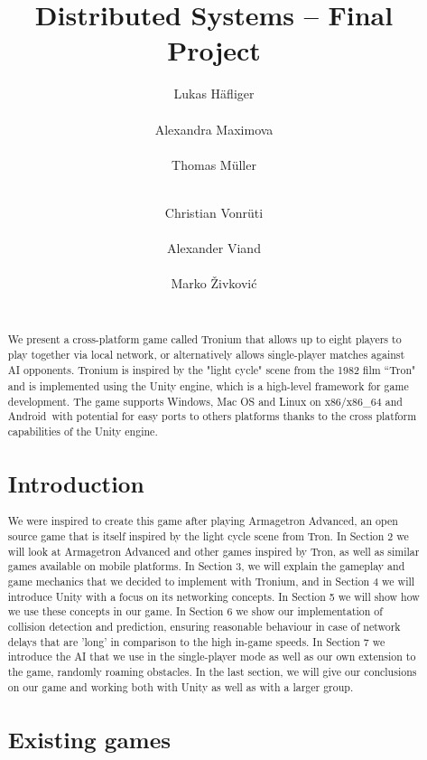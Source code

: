 \documentclass{report}
\title{Distributed Systems -- Final Project}
\author{
%
%
\alignauthor Lukas Häfliger\\
	\affaddr{ETH ID 11-916-376}\\
	\email{haelukas@student.ethz.ch}
\alignauthor Alexandra Maximova\\
 	\affaddr{ETH ID 09-913-534}\\
 	\email{amaximov@student.ethz.ch}
 	\alignauthor Thomas Müller\\
 	\affaddr{ETH ID 11-946-936}\\
 	\email{muelltho@student.ethz.ch} 
\and  %
\alignauthor Christian Vonrüti\\
 	\affaddr{ETH ID 11-930-914}\\
 	\email{cvonruet@student.ethz.ch} 
\alignauthor Alexander Viand\\
	\affaddr{ETH ID 09-940-131}\\
	\email{vianda@student.ethz.ch}
\alignauthor Marko Živković\\
	\affaddr{ETH ID 10-921-211}\\
	\email{markoz@student.ethz.ch}
}
\begin{document}
\maketitle

\begin{abstract}
We present a cross-platform game called Tronium that allows up to eight players to play together via local network, 
or alternatively allows single-player matches against AI opponents. 
Tronium is inspired by the "light cycle" scene from the 1982 film ``Tron" and is implemented using the  Unity\textsuperscript{\textregistered} 
engine, which is a high-level framework for game development.
The game supports Windows, Mac OS and Linux on x86/x86\_64 and Android\texttrademark \ 
with potential for easy ports to others platforms thanks to the cross platform capabilities of the Unity  engine.


 
\section{Introduction}

We were inspired to create this game after playing Armagetron Advanced\cite{AA}, an open source game that is itself inspired by the light cycle scene from Tron. 
In Section 2 we will look at Armagetron Advanced and other games inspired by Tron, as well as similar games available on mobile platforms.
In Section 3, we will explain the gameplay and game mechanics that we decided to implement with Tronium, and in  Section 4 we will introduce Unity with a focus on its networking concepts. In Section 5 we will show how we use these concepts in our game. 
In Section 6 we show our implementation of collision detection and prediction, ensuring reasonable behaviour in case of network delays that are 'long' in comparison to the high in-game speeds.
In Section 7 we introduce the AI that we use in the single-player mode as well as our own extension to the game,  randomly roaming obstacles.
In the last section, we will give our conclusions on our game and working both with Unity as well as with a larger group.

 
\section{Existing games}


\end{abstract}
\end{document}
